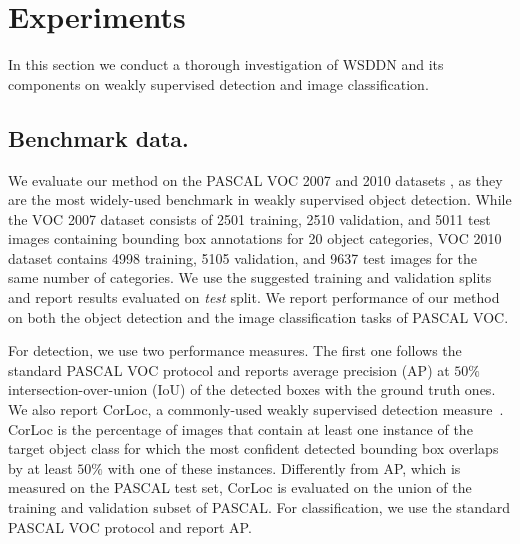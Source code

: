\documentclass[10pt,twocolumn,letterpaper]{article}
\begin{document}
\section{Experiments}\label{s:experiments}
In this section we conduct a thorough investigation of WSDDN and its components on weakly supervised detection and image classification.

\subsection{Benchmark data.}
We evaluate our method on the PASCAL VOC 2007 and 2010 datasets \cite{Everingham10}, as they are the most widely-used benchmark in weakly supervised object detection. While the VOC 2007 dataset consists of 2501 training, 2510 validation, and 5011 test images containing bounding box annotations for 20 object categories, VOC 2010 dataset contains 4998 training, 5105 validation, and 9637 test images for the same number of categories. We use the suggested training and validation splits and report results evaluated on \emph{test} split. We report performance of our method on both the object detection and the image classification tasks of PASCAL VOC. 

For detection, we use two performance measures. The first one follows the standard PASCAL VOC protocol and reports average precision (AP) at  $50\%$ intersection-over-union (IoU) of the detected boxes with the ground truth ones. We also report CorLoc, a commonly-used weakly supervised detection measure~\cite{Deselaers12}. CorLoc is the percentage of images that contain at least one instance of the target object class for which the most confident detected bounding box overlaps by at least $50\%$ with one of these instances. Differently from AP, which is measured on the PASCAL test set, CorLoc is evaluated on the union of the training and validation subset of PASCAL. For classification, we use the standard PASCAL VOC protocol and report AP.
\end{document}
